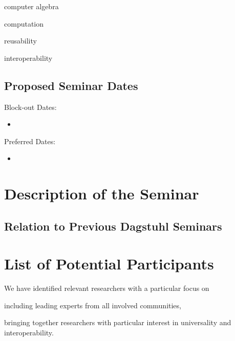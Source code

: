 \documentclass[a4paper,11pt]{article}
\begin{document}
\begin{compactitem}
\item computer algebra
\item computation
\item reusability
\item interoperability
\end{compactitem}

\subsection{Proposed Seminar Dates}


Block-out Dates: 
\begin{itemize}
\item 
\end{itemize}

\noindent
Preferred Dates: 
 \begin{itemize}
 \item 
\end{itemize}

\section{Description of the Seminar}
  

\subsection{Relation to Previous Dagstuhl Seminars}


\section{List of Potential Participants}

We have identified  relevant researchers with a particular focus on
\begin{compactitem}
  \item including leading experts from all involved communities,
  \item bringing together researchers with particular interest in universality and interoperability.
\end{compactitem}
\medskip
\end{document}
